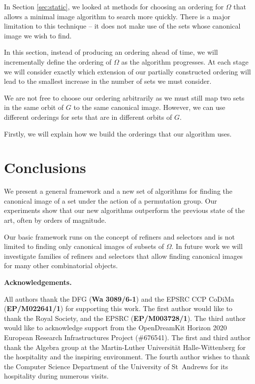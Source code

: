 \documentclass[preprint,12pt]{elsarticle}
\begin{document}
In Section \ref{sec:static}, we looked at methods for choosing an ordering for
\(\Omega\) that allows a minimal image algorithm to search more quickly.
There is a major limitation to this technique -- it does not make use of
the sets whose canonical image we wish to find.

In this section, instead of producing an ordering ahead of time, we will
incrementally define the ordering of \(\Omega\) as the algorithm
progresses.
At each stage we will consider exactly which extension of our partially
constructed ordering will lead to the smallest increase in the number of sets we
must consider.

We are not free to choose our ordering arbitrarily as we must still map two
sets in the same orbit of \(G\) to the same canonical image.
However, we can use different orderings for sets that are in different
orbits of \(G\).

Firstly, we will explain how we build the orderings that our algorithm uses.





\section{Conclusions}

We present a general framework and a new set of algorithms for finding the
canonical image of a set under the action of a permutation group. Our
experiments show that our new algorithms outperform the previous state of the art,
often by orders of magnitude.

Our basic framework runs on the concept of refiners and selectors and is not
limited to finding only canonical images of subsets of \(\Omega\). In future
work we will investigate families of refiners and selectors that allow finding
canonical images for many other combinatorial objects.

\vspace{1cm}

\textbf{Acknowledgements.}

All authors thank the DFG (\textbf{Wa 3089/6-1}) and the EPSRC CCP CoDiMa
(\textbf{EP/M022641/1}) for supporting this work. The first author would like to
thank the Royal Society, and the EPSRC (\textbf{EP/M003728/1}). The third
author would like to acknowledge support from the OpenDreamKit Horizon 2020
European Research Infrastructures Project (\#676541). The first and third author
thank the Algebra group at the Martin-Luther Universit\"at
Halle-Wittenberg for the hospitality and the inspiring environment. The fourth
author wishes to thank the Computer Science Department of the University of
St~Andrews for its hospitality during numerous visits.



\end{document}
